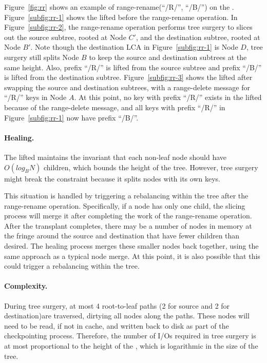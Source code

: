 Figure~\ref{fig:rr} shows an example of range-rename(``/R/'', ``/B/'') on the
\bet.
Figure~\ref{subfig:rr-1} shows the lifted \bet before the range-rename
operation.
In Figure~\ref{subfig:rr-2}, the range-rename operation performs tree surgery
to slices out the source subtree, rooted at Node $C'$,
and the destination subtree, rooted at Node $B'$.
Note though the destination LCA in Figure~\ref{subfig:rr-1} is Node $D$,
tree surgery still splits Node $B$
to keep the source and destination subtrees at the same height.
Also, prefix ``/R/'' is lifted from the source subtree and prefix ``/B/''
is lifted from the destination subtree.
Figure~\ref{subfig:rr-3} shows the lifted \bet after swapping the source and
destination subtrees, with a range-delete message for ``/R/'' keys in Node $A$.
At this point, no key with prefix ``/R/'' exists in the lifted \bet because of
the range-delete message, and all keys with prefix ``/R/'' in
Figure~\ref{subfig:rr-1} now have prefix ``/B/''.

\paragraph{Healing.}
The lifted \bets maintains the invariant that each non-leaf node should have
$O(log_{B}{N})$ children, which bounds the height of the tree.
However, tree surgery might break the constraint because it splits nodes with
its own keys.

This situation is handled by triggering a rebalancing within the tree after
the range-rename operation.
Specifically, if a node has only one child, the slicing process will merge
it after completing the work of the range-rename operation.
After the transplant completes, there may be a number of \bet nodes in memory at
the fringe around the source and destination that have fewer children than
desired.
The healing process merges these smaller nodes back together,
using the same approach as a typical \bet node merge.
At this point, it is also possible that this could trigger a rebalancing within
the tree.

\paragraph{Complexity.}
During tree surgery, at most 4 root-to-leaf paths
(2 for source and 2 for destination)are traversed, dirtying all
nodes along the paths.
These nodes will need to be read, if not in cache, and written back to disk as
part of the checkpointing process.
Therefore, the number of I/Os required in tree surgery is at most proportional
to the height of the \bet, which is logarithmic in the size of the tree.

